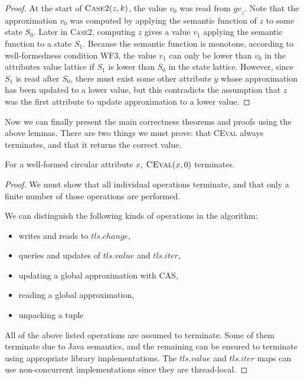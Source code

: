 {\begin{proof}
  At the start of $\textsc{Case2}(z, k)$, the value $v_0$ was read from $\mathit{gv}_z$. Note that
  the approximation
  $v_0$ was computed by applying the semantic function of $z$ to some state $S_0$.
  Later in \textsc{Case2}, computing $z$ gives a value $v_1$
  applying the semantic function to a state $S_1$. Because the semantic function is monotone,
  according to well-formedness condition WF3,
  the value $v_1$ can only be lower than $v_0$ in the attributes value lattice if $S_1$ is
  lower than $S_0$ in the state lattice. However, since $S_1$ is read after $S_0$, there must exist
  some other attribute $y$ whose approximation has been updated to a lower value, but this
  contradicts the assumption that $z$ was the first attribute to update approximation to a lower
  value.
\end{proof}

Now we can finally present the main correctness theorems and proofs using the above lemmas.
There are two things we must prove: that \textsc{CEval} always terminates, and that it returns the
correct value.

\begin{theorem}[Termination]
  For a well-formed circular attribute $x$,
  $\textsc{CEval}(x, 0)$ terminates.

  \label{eval_terminates}
\end{theorem}

\begin{proof}
  We must show that all individual operations terminate, and that only a finite
  number of those operations are performed.

  We can distinguish the following kinds of operations in the algorithm:

  \begin{itemize}
    \item writes and reads to $\mathit{tls}.change$,
    \item queries and updates of $\mathit{tls}.value$ and $\mathit{tls}.iter$,
    \item updating a global approximation with CAS,
    \item reading a global approximation,
    \item unpacking a tuple
  \end{itemize}

  All of the above listed operations are assumed to terminate. Some of them terminate
  due to Java semantics, and the remaining can be ensured to terminate using appropriate
  library implementations. The $\mathit{tls}.value$ and $\mathit{tls}.iter$ maps can use non-concurrent
  implementations since they are thread-local.


\end{proof}}
